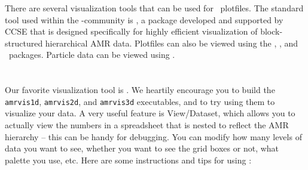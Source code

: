 There are several visualization tools that can be used for \amrex\
plotfiles.  The standard tool used within the
\amrex-community is \amrvis, a package developed and supported 
by CCSE that is designed specifically for highly efficient visualization
of block-structured hierarchical AMR data.
Plotfiles can also be viewed using the \visit, \paraview, and \yt\ packages.
Particle data can be viewed using \paraview.

\section{\amrvis}

Our favorite visualization tool is \amrvis. We heartily encourage you
to build the {\tt amrvis1d}, {\tt amrvis2d}, and {\tt amrvis3d} executables,
and to try using them
to visualize your data. A very useful feature is View/Dataset, which
allows you to actually view the numbers in a spreadsheet that is nested
to reflect the AMR hierarchy -- this can be handy for
debugging. You can modify how many levels of data you want to see,
whether you want to see the grid boxes or not, what palette you use,
etc.  Here are some instructions and tips for using \amrvis:

